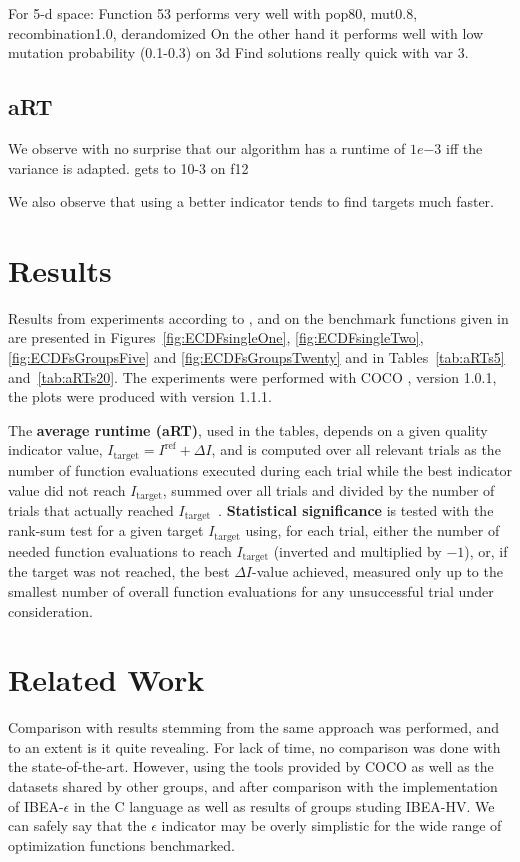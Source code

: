 \documentclass{sig-alternate}
\newcommand{\DI}{\ensuremath{\Delta I}}
\newcommand{\Itarget}{\ensuremath{I_\mathrm{target}}}
\newcommand{\change}[1]{{\color{red} #1}}
\newcommand{\hvref}{I^{\mathrm{ref}}}
\begin{document}
For 5-d space:
Function 53 performs very well with pop80, mut0.8, recombination1.0, derandomized
On the other hand it performs well with low mutation probability (0.1-0.3) on 3d
Find solutions really quick with var 3.

\subsection{aRT}
We observe with no surprise that our algorithm has a runtime of $1e{-3}$ iff the variance is adapted. gets to 10-3 on f12

We also observe that using a better indicator tends to find targets much faster.

\section{Results}

Results from experiments according to \cite{hansen2016exp},
\cite{hansen2016perfass} and \cite{biobj2016perfass} on the benchmark
functions given in \cite{biobj2016func} are presented in
Figures~\ref{fig:ECDFsingleOne}, \ref{fig:ECDFsingleTwo}, \ref{fig:ECDFsGroupsFive} and
\ref{fig:ECDFsGroupsTwenty} and in Tables~\ref{tab:aRTs5} and~\ref{tab:aRTs20}.
The experiments were performed with COCO \cite{hansen2016cocoplat}, version
\change{1.0.1}, the plots were produced with version \change{1.1.1}.

The \textbf{average runtime (aRT)}, used in the %
tables,
depends on a given quality indicator value, $\Itarget=\hvref+\DI$, and is
computed over all relevant trials as the number of function
evaluations executed during each trial while the best indicator value
did not reach \Itarget, summed over all trials and divided by the
number of trials that actually reached \Itarget\
\cite{hansen2016exp,price1997dev}.  \textbf{Statistical significance}
is tested with the rank-sum test for a given target $\Itarget$
using, for each trial,
either the number of needed function evaluations to reach
$\Itarget$ (inverted and multiplied by $-1$), or, if the target
was not reached, the best $\DI$-value achieved, measured only up to
the smallest number of overall function evaluations for any
unsuccessful trial under consideration.


\section{Related Work}
Comparison with results stemming from the same approach was performed, and to an extent is it quite revealing. For lack of time, no comparison was done with the state-of-the-art. However, using the tools provided by COCO as well as the datasets shared by other groups, and after comparison with the implementation of IBEA-$\epsilon$ in the C language as well as results of groups studing IBEA-HV. We can safely say that the $\epsilon$ indicator may be overly simplistic for the wide range of optimization functions benchmarked.
\end{document}
